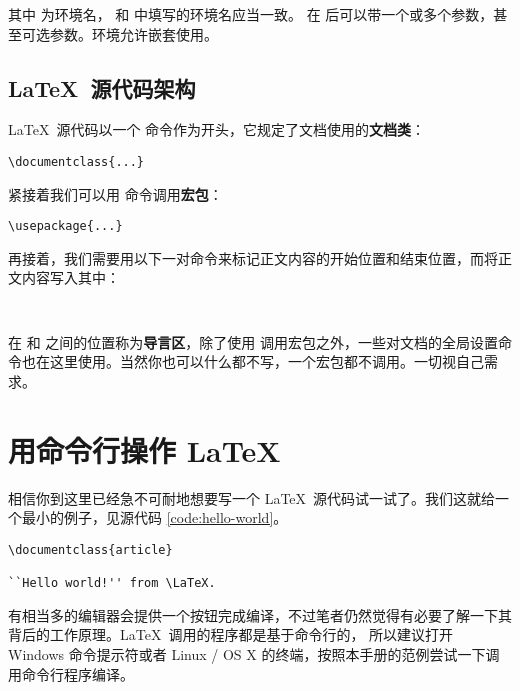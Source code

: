 其中  为环境名， 和  中填写的环境名应当一致。
 在  后可以带一个或多个参数，甚至可选参数。环境允许嵌套使用。

\subsection{\LaTeX\ 源代码架构}\label{subsec:struct}

\LaTeX\ 源代码以一个  命令作为开头，它规定了文档使用的\textbf{文档类}：
\begin{verbatim}
\documentclass{...}
\end{verbatim}

紧接着我们可以用  命令调用\textbf{宏包}：
\begin{verbatim}
\usepackage{...}
\end{verbatim}

再接着，我们需要用以下一对命令来标记正文内容的开始位置和结束位置，而将正文内容写入其中：
\begin{verbatim}


\end{verbatim}

在  和  之间的位置称为\textbf{导言区}，除了使用 
调用宏包之外，一些对文档的全局设置命令也在这里使用。当然你也可以什么都不写，一个宏包都不调用。一切视自己需求。

\section{用命令行操作 \LaTeX}

相信你到这里已经急不可耐地想要写一个 \LaTeX\ 源代码试一试了。我们这就给一个最小的例子，见源代码 \ref{code:hello-world}。

\begin{sourcecode}[hbp]
\begin{Verbatim}
\documentclass{article}

``Hello world!'' from \LaTeX.

\end{Verbatim}
\caption{\LaTeX\ 的一个最简单的源代码示例。}\label{code:hello-world}
\end{sourcecode}

有相当多的编辑器会提供一个按钮完成编译，不过笔者仍然觉得有必要了解一下其背后的工作原理。\LaTeX\ 调用的程序都是基于命令行的，
所以建议打开 Windows 命令提示符或者 Linux / OS X 的终端，按照本手册的范例尝试一下调用命令行程序编译。

